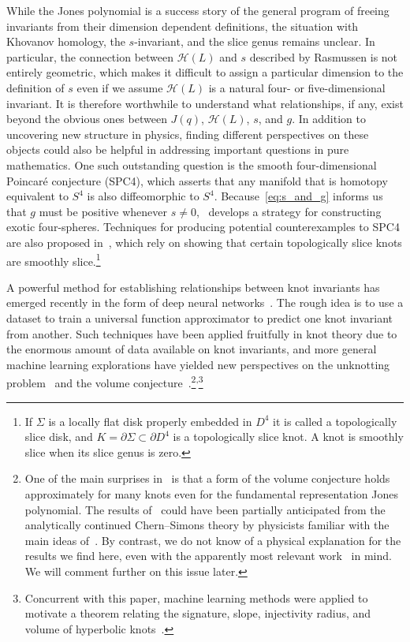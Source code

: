 \documentclass[11pt]{article}
\numberwithin{equation}{section}
\begin{document}
While the Jones polynomial is a success story of the general program of freeing invariants from their dimension dependent definitions, the situation with Khovanov homology, the $s$-invariant, and the slice genus remains unclear.
In particular, the connection between $\mathcal{H}(L)$ and $s$ described by Rasmussen is not entirely geometric, which makes it difficult to assign a particular dimension to the definition of $s$ even if we assume $\mathcal{H}(L)$ is a natural four- or five-dimensional invariant.
It is therefore worthwhile to understand what relationships, if any, exist beyond the obvious ones between $J(q)$, $\mathcal{H}(L)$, $s$, and $g$.
In addition to uncovering new structure in physics, finding different perspectives on these objects could also be helpful in addressing important questions in pure mathematics.
One such outstanding question is the smooth four-dimensional Poincar\'e conjecture (SPC4), which asserts that any manifold that is homotopy equivalent to $S^4$ is also diffeomorphic to $S^4$.
Because~\eqref{eq:s_and_g} informs us that $g$ must be positive whenever $s\ne 0$,~\cite{freedman2010man} develops a strategy for constructing exotic four-spheres.
Techniques for producing potential counterexamples to SPC4 are also proposed in~\cite{manolescu2021zero}, which rely on showing that certain topologically slice knots are smoothly slice.\footnote{
If $\Sigma$ is a locally flat disk properly embedded in $D^4$ it is called a topologically slice disk, and $K=\partial \Sigma \subset \partial D^4$ is a topologically slice knot.
A knot is smoothly slice when its slice genus is zero.}

A powerful method for establishing relationships between knot invariants has emerged recently in the form of deep neural networks~\cite{hughes2016neural,Jejjala:2019kio}.
The rough idea is to use a dataset to train a universal function approximator to predict one knot invariant from another.
Such techniques have been applied fruitfully in knot theory due to the enormous amount of data available on knot invariants, and more general machine learning explorations have yielded new perspectives on the unknotting problem~\cite{Gukov:2020qaj} and the volume conjecture~\cite{Craven:2020bdz}.\footnote{
One of the main surprises in~\cite{Jejjala:2019kio,Craven:2020bdz} is that a form of the volume conjecture holds approximately for many knots even for the fundamental representation Jones polynomial.
The results of~\cite{Jejjala:2019kio,Craven:2020bdz} could have been partially anticipated from the analytically continued Chern--Simons theory by physicists familiar with the main ideas of~\cite{Witten:2010cx}.
By contrast, we do not know of a physical explanation for the results we find here, even with the apparently most relevant work~\cite{Witten:2011zz} in mind.
We will comment further on this issue later.}\textsuperscript{,}\footnote{
Concurrent with this paper, machine learning methods were applied to motivate a theorem relating the signature, slope, injectivity radius, and volume of hyperbolic knots~\cite{davies2021advancing, davies2021signature}.
}
\end{document}
